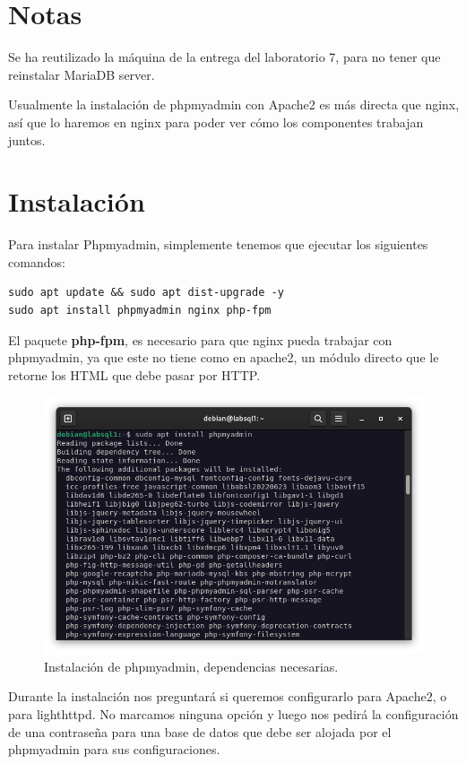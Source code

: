 \section{Notas}

Se ha reutilizado la máquina de la entrega del laboratorio 7, para no tener que reinstalar MariaDB server.
\vspace{5mm}

Usualmente la instalación de phpmyadmin con Apache2 es más directa que nginx, así que lo haremos en nginx para poder ver cómo los componentes trabajan juntos.

\section{Instalación}

Para instalar Phpmyadmin, simplemente tenemos que ejecutar los siguientes comandos:

\begin{lstlisting}[style=mybash]
sudo apt update && sudo apt dist-upgrade -y
sudo apt install phpmyadmin nginx php-fpm
\end{lstlisting}

El paquete \textbf{php-fpm}, es necesario para que nginx pueda trabajar con phpmyadmin, ya que este no tiene como en apache2, un módulo directo que le retorne los HTML que debe pasar por HTTP.

\begin{figure}[H]
	\centering
	\includegraphics[scale=0.30]{00}
	\caption{Instalación de phpmyadmin, dependencias necesarias.}
\end{figure}

Durante la instalación nos preguntará si queremos configurarlo para Apache2, o para lighthttpd. No marcamos ninguna opción y luego nos pedirá la configuración de una contraseña para una base de datos que debe ser alojada por el phpmyadmin para sus configuraciones.

